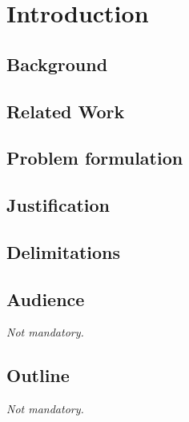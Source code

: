 \chapter{Introduction}

\lipsum[1]

\section{Background}

\lipsum[2-3]

\section{Related Work}

\lipsum[4]

\section{Problem formulation}

\lipsum[5]

\section{Justification}

\lipsum[6]

\section{Delimitations}

\lipsum[7]

\section{Audience}

\emph{Not mandatory.}

\lipsum[8]

\section{Outline}

\emph{Not mandatory.}

\lipsum[9]